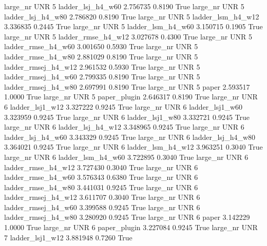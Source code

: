   large_nr      UNR                 5   ladder_lsj_h4_w60    2.756735      0.8190    True
  large_nr      UNR                 5   ladder_lsj_h4_w80    2.786820      0.8190    True
  large_nr      UNR                 5   ladder_lsm_h4_w12    3.336835      0.2445    True
  large_nr      UNR                 5   ladder_lsm_h4_w60    3.150715      0.1905    True
  large_nr      UNR                 5  ladder_rmse_h4_w12    3.027678      0.4300    True
  large_nr      UNR                 5  ladder_rmse_h4_w60    3.001650      0.5930    True
  large_nr      UNR                 5  ladder_rmse_h4_w80    2.881029      0.8190    True
  large_nr      UNR                 5 ladder_rmsej_h4_w12    2.961532      0.5930    True
  large_nr      UNR                 5 ladder_rmsej_h4_w60    2.799335      0.8190    True
  large_nr      UNR                 5 ladder_rmsej_h4_w80    2.697991      0.8190    True
  large_nr      UNR                 5               paper    2.593517      1.0000    True
  large_nr      UNR                 5        paper_plugin    2.646317      0.8190    True
  large_nr      UNR                 6     ladder_lsj1_w12    3.327222      0.9245    True
  large_nr      UNR                 6     ladder_lsj1_w60    3.323959      0.9245    True
  large_nr      UNR                 6     ladder_lsj1_w80    3.332721      0.9245    True
  large_nr      UNR                 6   ladder_lsj_h4_w12    3.348965      0.9245    True
  large_nr      UNR                 6   ladder_lsj_h4_w60    3.343329      0.9245    True
  large_nr      UNR                 6   ladder_lsj_h4_w80    3.364021      0.9245    True
  large_nr      UNR                 6   ladder_lsm_h4_w12    3.963251      0.3040    True
  large_nr      UNR                 6   ladder_lsm_h4_w60    3.722895      0.3040    True
  large_nr      UNR                 6  ladder_rmse_h4_w12    3.727430      0.3040    True
  large_nr      UNR                 6  ladder_rmse_h4_w60    3.576343      0.6380    True
  large_nr      UNR                 6  ladder_rmse_h4_w80    3.441031      0.9245    True
  large_nr      UNR                 6 ladder_rmsej_h4_w12    3.611707      0.3040    True
  large_nr      UNR                 6 ladder_rmsej_h4_w60    3.399588      0.9245    True
  large_nr      UNR                 6 ladder_rmsej_h4_w80    3.280920      0.9245    True
  large_nr      UNR                 6               paper    3.142229      1.0000    True
  large_nr      UNR                 6        paper_plugin    3.227084      0.9245    True
  large_nr      UNR                 7     ladder_lsj1_w12    3.881948      0.7260    True
